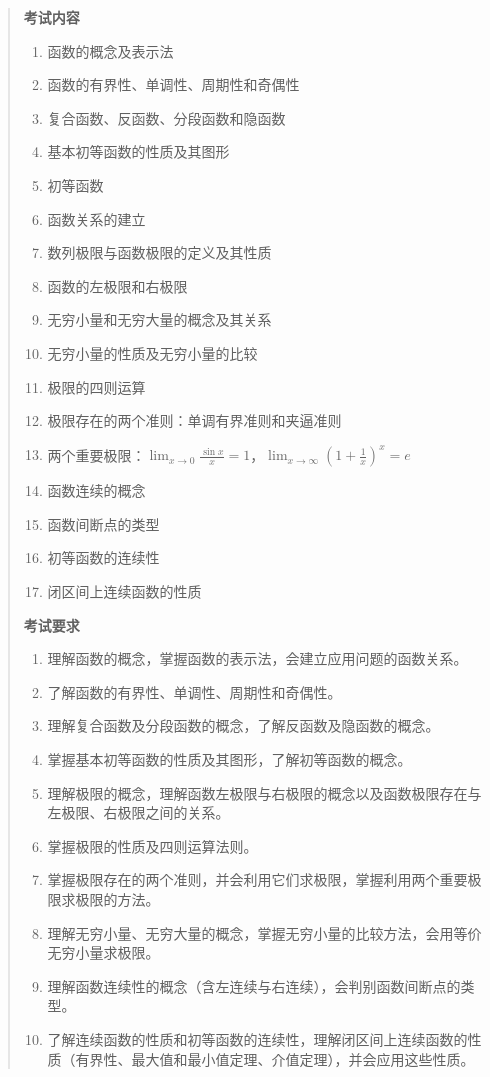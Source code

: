 \documentclass[11pt,openany,UTF8]{ctexbook}
\begin{document}
\begin{quote}
\textbf{考试内容}

\begin{enumerate}
\item 函数的概念及表示法
\item 函数的有界性、单调性、周期性和奇偶性
\item 复合函数、反函数、分段函数和隐函数
\item 基本初等函数的性质及其图形
\item 初等函数
\item 函数关系的建立
\item 数列极限与函数极限的定义及其性质
\item 函数的左极限和右极限
\item 无穷小量和无穷大量的概念及其关系
\item 无穷小量的性质及无穷小量的比较
\item 极限的四则运算
\item 极限存在的两个准则：单调有界准则和夹逼准则
\item 两个重要极限：$\lim_{x\to 0}\frac{\sin x}{x}=1$，$\lim_{x\to\infty}\left(1+\frac1x\right)^x=e$
\item 函数连续的概念
\item 函数间断点的类型
\item 初等函数的连续性
\item 闭区间上连续函数的性质
\end{enumerate}
\textbf{考试要求}

\begin{enumerate}
\item 理解函数的概念，掌握函数的表示法，会建立应用问题的函数关系。
\item 了解函数的有界性、单调性、周期性和奇偶性。
\item 理解复合函数及分段函数的概念，了解反函数及隐函数的概念。
\item 掌握基本初等函数的性质及其图形，了解初等函数的概念。
\item 理解极限的概念，理解函数左极限与右极限的概念以及函数极限存在与左极限、右极限之间的关系。
\item 掌握极限的性质及四则运算法则。
\item 掌握极限存在的两个准则，并会利用它们求极限，掌握利用两个重要极限求极限的方法。
\item 理解无穷小量、无穷大量的概念，掌握无穷小量的比较方法，会用等价无穷小量求极限。
\item 理解函数连续性的概念（含左连续与右连续），会判别函数间断点的类型。
\item 了解连续函数的性质和初等函数的连续性，理解闭区间上连续函数的性质（有界性、最大值和最小值定理、介值定理），并会应用这些性质。
\end{enumerate}
\end{quote}
\end{document}
